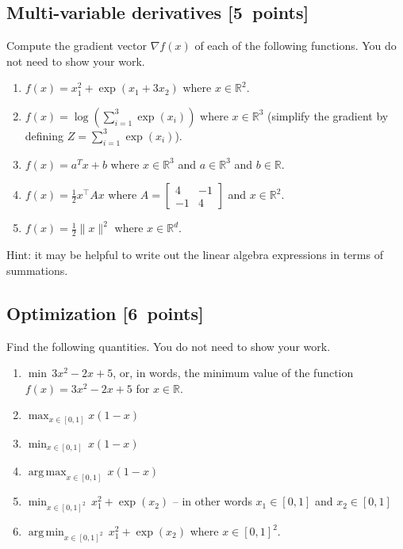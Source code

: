 \documentclass{article}
\newcommand{\blu}[1]{{\textcolor{blu}{#1}}}
\let\ask\blu
\newcommand\pts[1]{\textcolor{pointscolour}{[#1~points]}}
\def\R{\mathbb{R}}
\DeclareMathOperator*{\argmax}{arg\,max}
\DeclareMathOperator*{\argmin}{arg\,min}
\newcommand{\norm}[1]{\lVert #1 \rVert}
\begin{document}
  \subsection{Multi-variable derivatives \pts{5}}
  \label{sub.multi.var}

  \ask{Compute the gradient vector $\nabla f(x)$ of each of the following functions.} You do not need to show your work.
  \begin{enumerate}
  \item $f(x) = x_1^2 + \exp(x_1 + 3x_2)$ where $x \in \R^2$.
  \item $f(x) = \log\left(\sum_{i=1}^3\exp(x_i)\right)$ where $x \in \R^3$ (simplify the gradient by defining $Z = \sum_{i=1}^3\exp(x_i)$).
  \item $f(x) = a^Tx + b$ where $x \in \R^3$ and $a \in \R^3$ and $b \in \R$.
  \item $f(x) = \frac12 x^\top A x$ where $A=\left[ \begin{array}{cc}
  4 & -1 \\
  -1 & 4 \end{array} \right]$ and $x \in \mathbb{R}^2$.
  \item $f(x) = \frac{1}{2}\norm{x}^2$ where $x \in \R^d$.
  \end{enumerate}

  Hint: it may be helpful to write out the linear algebra expressions in terms of summations.


  \subsection{Optimization \pts{6}}

  \ask{Find the following quantities.} You do not need to show your work.
  

  \begin{enumerate}
  \item $\min \, 3x^2-2x+5$, or, in words, the minimum value of the function $f(x) = 3x^2 -2x + 5$ for $x \in \R$.
  \item $\max_{x \in [0, 1]} x(1-x)$
  \item $\min_{x \in [0, 1]} \, x(1-x)$
  \item $\argmax_{x \in [0,1]} \, x(1-x)$
  \item $\min_{x \in [0, 1]^2} \, x_1^2 + \exp(x_2)$ -- in other words $x_1\in [0,1]$ and $x_2\in [0,1]$
  \item $\argmin_{x \in [0,1]^2} \, x_1^2 + \exp(x_2)$ where $x \in [0,1]^2$.
  \end{enumerate}
\end{document}

